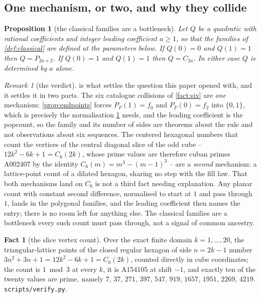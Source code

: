 \documentclass[11pt]{amsart}
\newtheorem{proposition}[theorem]{Proposition}
\theoremstyle{definition}
\newtheorem{fact}[theorem]{Fact}
\theoremstyle{remark}
\newtheorem{remark}[theorem]{Remark}
\begin{document}
\subsection*{One mechanism, or two, and why they collide}

\begin{proposition}[the classical families are a bottleneck]
\label{prop:pigeon}
Let $Q$ be a quadratic with rational coefficients and integer leading coefficient $a \ge 1$, so that the families of \cref{def:classical} are defined at the parameters below. If $Q(0)=0$ and $Q(1)=1$ then $Q = P_{2a+2}$. If $Q(0)=1$ and $Q(1)=1$ then $Q = C_{2a}$. In either case $Q$ is determined by $a$ alone.
\end{proposition}

\begin{remark}[the verdict]
\label{rem:verdict}
 is what settles the question this paper opened with, and it settles it in two parts. The six catalogue collisions of \cref{fact:six} are \emph{one} mechanism: \cref{prop:endpoints} forces $P_{F}(1) = f_{0}$ and $P_{F}(0) = f_{2}$ into $\{0,1\}$, which is precisely the normalisation \cref{prop:pigeon} needs, and the leading coefficient is the popcount, so the family and its number of sides are theorems about the rule and not observations about six sequences. The centered hexagonal numbers that count the vertices of the central diagonal slice of the odd cube -- $12k^{2}-6k+1 = C_{6}(2k)$, whose prime values are therefore cuban primes A002407 by the identity $C_{6}(m) = m^{3}-(m-1)^{3}$ -- are a \emph{second} mechanism: a lattice-point count of a dilated hexagon, sharing no step with the fill law. That both mechanisms land on $C_{6}$ is not a third fact needing explanation. Any planar count with constant second difference, normalised to start at $1$ and pass through $1$, lands in the polygonal families, and the leading coefficient then names the entry; there is no room left for anything else. The classical families are a bottleneck every such count must pass through, not a signal of common ancestry.
\end{remark}

\begin{fact}[the slice vertex count]
\label{fact:mesh}
Over the exact finite domain $k = 1,\dots,20$, the triangular-lattice points of the closed regular hexagon of side $n = 2k-1$ number $3n^{2}+3n+1 = 12k^{2}-6k+1 = C_{6}(2k)$, counted directly in cube coordinates; the count is $1 \bmod 3$ at every $k$, it is A154105 at shift $-1$, and exactly ten of the twenty values are prime, namely $7$, $37$, $271$, $397$, $547$, $919$, $1657$, $1951$, $2269$, $4219$. \texttt{scripts/\allowbreak verify.py}.
\end{fact}
\end{document}
